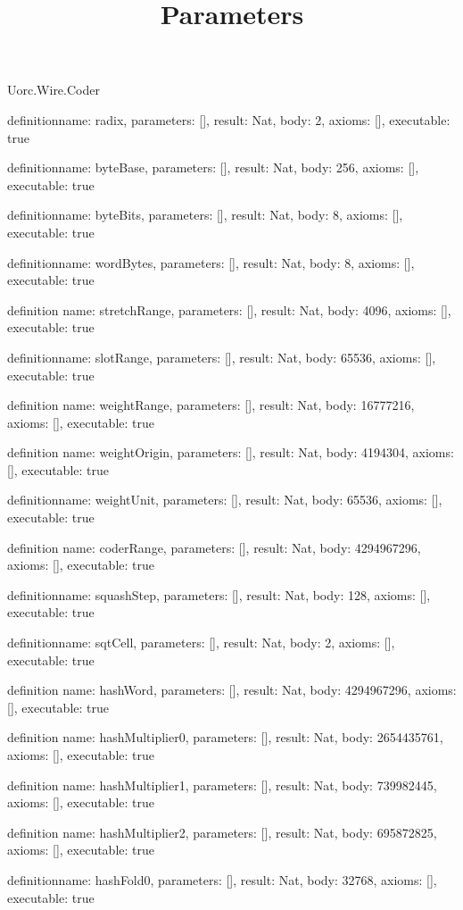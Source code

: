 \begin{lexlean}{Uorc.Wire.Coder}
\title{Parameters}
\begin{semanticmodule}
definition{name: radix, parameters: [], result: Nat, body: 2, axioms: [], executable: true}

definition{name: byteBase, parameters: [], result: Nat, body: 256, axioms: [], executable: true}

definition{name: byteBits, parameters: [], result: Nat, body: 8, axioms: [], executable: true}

definition{name: wordBytes, parameters: [], result: Nat, body: 8, axioms: [], executable: true}

definition{
  name: stretchRange,
  parameters: [],
  result: Nat,
  body: 4096,
  axioms: [],
  executable: true
}

definition{name: slotRange, parameters: [], result: Nat, body: 65536, axioms: [], executable: true}

definition{
  name: weightRange,
  parameters: [],
  result: Nat,
  body: 16777216,
  axioms: [],
  executable: true
}

definition{
  name: weightOrigin,
  parameters: [],
  result: Nat,
  body: 4194304,
  axioms: [],
  executable: true
}

definition{name: weightUnit, parameters: [], result: Nat, body: 65536, axioms: [], executable: true}

definition{
  name: coderRange,
  parameters: [],
  result: Nat,
  body: 4294967296,
  axioms: [],
  executable: true
}

definition{name: squashStep, parameters: [], result: Nat, body: 128, axioms: [], executable: true}

definition{name: sqtCell, parameters: [], result: Nat, body: 2, axioms: [], executable: true}

definition{
  name: hashWord,
  parameters: [],
  result: Nat,
  body: 4294967296,
  axioms: [],
  executable: true
}

definition{
  name: hashMultiplier0,
  parameters: [],
  result: Nat,
  body: 2654435761,
  axioms: [],
  executable: true
}

definition{
  name: hashMultiplier1,
  parameters: [],
  result: Nat,
  body: 739982445,
  axioms: [],
  executable: true
}

definition{
  name: hashMultiplier2,
  parameters: [],
  result: Nat,
  body: 695872825,
  axioms: [],
  executable: true
}

definition{name: hashFold0, parameters: [], result: Nat, body: 32768, axioms: [], executable: true}


\end{semanticmodule}
\end{lexlean}
